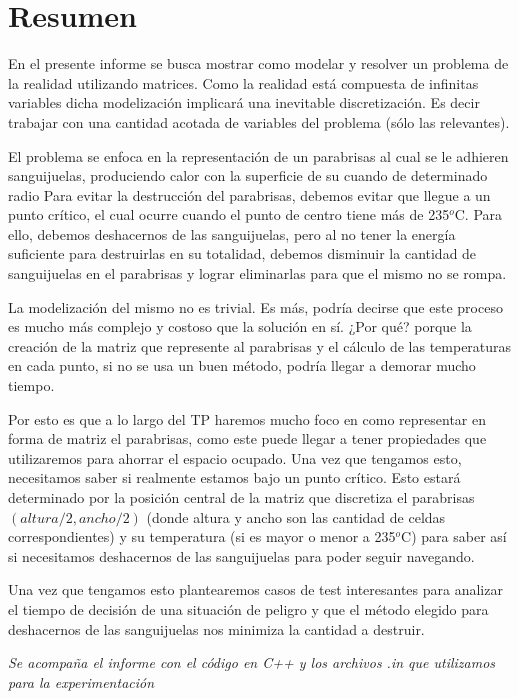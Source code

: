 \section{Resumen}

En el presente informe se busca mostrar como modelar y resolver un problema de la realidad utilizando matrices. Como la realidad está compuesta de infinitas variables dicha modelización implicará una inevitable discretización. Es decir trabajar con una 
cantidad acotada de variables del problema (sólo las relevantes).

El problema se enfoca en la representación de un parabrisas al cual se le adhieren sanguijuelas, produciendo calor con la superficie de su cuando de determinado radio Para evitar la destrucción del parabrisas, debemos evitar que llegue a un punto crítico, el cual ocurre cuando el punto de centro tiene más de 235${}^o$C. Para ello, debemos deshacernos de las sanguijuelas, pero al no tener la energía suficiente para destruirlas en su totalidad, debemos disminuir la cantidad de sanguijuelas en el parabrisas y lograr eliminarlas para que el mismo no se rompa.

La modelización del mismo no es trivial. Es más, podría decirse que este proceso es mucho más complejo y costoso que la solución en sí. ¿Por qué? porque la creación de la matriz que represente al parabrisas y el cálculo de las temperaturas en cada punto, si no se usa un buen método, podría llegar a demorar mucho tiempo. 

Por esto es que a lo largo del TP haremos mucho foco en como representar en forma de matriz el parabrisas, como este puede llegar a tener propiedades que utilizaremos para ahorrar el espacio ocupado. Una vez que tengamos esto, necesitamos saber si realmente estamos bajo un punto crítico. Esto estará determinado por la posición central  de la matriz que discretiza el parabrisas $(altura/2,ancho/2)$ (donde altura y ancho son las cantidad de celdas correspondientes) y su temperatura (si es mayor o menor a 235${}^o$C) para saber así si necesitamos deshacernos de las sanguijuelas para poder seguir navegando.

Una vez que tengamos esto plantearemos casos de test interesantes para analizar el tiempo de decisión de una situación de peligro y que el método elegido para deshacernos de las sanguijuelas nos minimiza la cantidad a destruir.

\textit{Se acompaña el informe con el código en C++ y los archivos .in que utilizamos para la experimentación}


